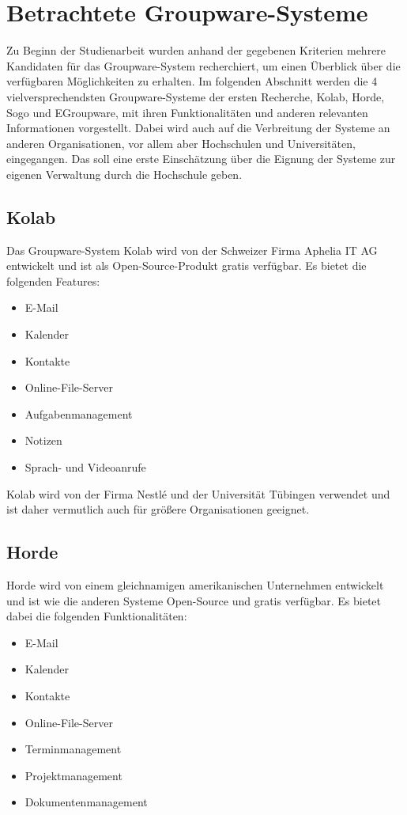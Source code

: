 \newpage

\section{Betrachtete Groupware-Systeme}

Zu Beginn der Studienarbeit wurden anhand der gegebenen Kriterien mehrere Kandidaten für das Groupware-System recherchiert, um einen Überblick über die verfügbaren Möglichkeiten zu erhalten.
Im folgenden Abschnitt werden die 4 vielversprechendsten Groupware-Systeme der ersten Recherche, Kolab, Horde, Sogo und EGroupware, mit ihren Funktionalitäten und anderen relevanten Informationen vorgestellt.
Dabei wird auch auf die Verbreitung der Systeme an anderen Organisationen, vor allem aber Hochschulen und Universitäten, eingegangen.
Das soll eine erste Einschätzung über die Eignung der Systeme zur eigenen Verwaltung durch die Hochschule geben.


\subsection{Kolab}

Das Groupware-System Kolab wird von der Schweizer Firma Aphelia IT AG entwickelt und ist als Open-Source-Produkt gratis verfügbar. Es bietet die folgenden Features:
\begin{itemize}
    \item E-Mail
    \item Kalender
    \item Kontakte
    \item Online-File-Server
    \item Aufgabenmanagement
    \item Notizen
    \item Sprach- und Videoanrufe
\end{itemize}
\autocite[Quelle:][]{kolab}

Kolab wird von der Firma Nestlé und der Universität Tübingen verwendet und ist daher vermutlich auch für größere Organisationen geeignet.

\subsection{Horde}

Horde wird von einem gleichnamigen amerikanischen Unternehmen entwickelt und ist wie die anderen Systeme Open-Source und gratis verfügbar. Es bietet dabei die folgenden Funktionalitäten:
\begin{itemize}
    \item E-Mail
    \item Kalender
    \item Kontakte
    \item Online-File-Server
    \item Terminmanagement
    \item Projektmanagement
    \item Dokumentenmanagement
    
\end{itemize}
\autocite[Quelle:][]{horde}

